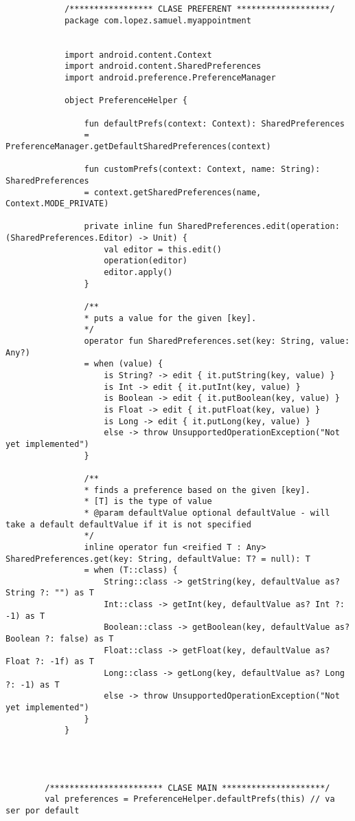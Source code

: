 \documentclass[a4paper]{article}
\begin{document}
		\begin{lstlisting}
			/***************** CLASE PREFERENT *******************/
			package com.lopez.samuel.myappointment
			
			
			import android.content.Context
			import android.content.SharedPreferences
			import android.preference.PreferenceManager
			
			object PreferenceHelper {
				
				fun defaultPrefs(context: Context): SharedPreferences
				= PreferenceManager.getDefaultSharedPreferences(context)
				
				fun customPrefs(context: Context, name: String): SharedPreferences
				= context.getSharedPreferences(name, Context.MODE_PRIVATE)
				
				private inline fun SharedPreferences.edit(operation: (SharedPreferences.Editor) -> Unit) {
					val editor = this.edit()
					operation(editor)
					editor.apply()
				}
				
				/**
				* puts a value for the given [key].
				*/
				operator fun SharedPreferences.set(key: String, value: Any?)
				= when (value) {
					is String? -> edit { it.putString(key, value) }
					is Int -> edit { it.putInt(key, value) }
					is Boolean -> edit { it.putBoolean(key, value) }
					is Float -> edit { it.putFloat(key, value) }
					is Long -> edit { it.putLong(key, value) }
					else -> throw UnsupportedOperationException("Not yet implemented")
				}
				
				/**
				* finds a preference based on the given [key].
				* [T] is the type of value
				* @param defaultValue optional defaultValue - will take a default defaultValue if it is not specified
				*/
				inline operator fun <reified T : Any> SharedPreferences.get(key: String, defaultValue: T? = null): T
				= when (T::class) {
					String::class -> getString(key, defaultValue as? String ?: "") as T
					Int::class -> getInt(key, defaultValue as? Int ?: -1) as T
					Boolean::class -> getBoolean(key, defaultValue as? Boolean ?: false) as T
					Float::class -> getFloat(key, defaultValue as? Float ?: -1f) as T
					Long::class -> getLong(key, defaultValue as? Long ?: -1) as T
					else -> throw UnsupportedOperationException("Not yet implemented")
				}
			}
		
		
		
		
		/*********************** CLASE MAIN *********************/
		val preferences = PreferenceHelper.defaultPrefs(this) // va ser por default
		

\end{lstlisting}
\end{document}
